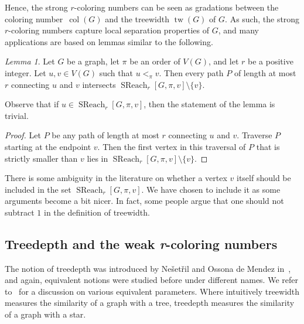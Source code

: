 \documentclass[1p,number,a4paper]{elsarticle}
\theoremstyle{remark}
\DeclareMathOperator{\col}{col}
\DeclareMathOperator{\tw}{tw}
\DeclareMathOperator{\SReach}{SReach}
\newtheorem{lemma}[theorem]{Lemma}
\begin{document}
Hence, the strong $r$-coloring numbers can be seen as gradations 
between the coloring number~$\col(G)$ and the treewidth $\tw(G)$ of
$G$. As such, the strong $r$-coloring numbers 
capture local separation properties of $G$, and many applications are based
on lemmas similar to the following. 

\pagebreak

\begin{lemma}\label{lem:sep-col}
Let $G$ be a graph, let $\pi$ be an order of $V(G)$, and let 
$r$ be a positive integer. Let $u,v\in 
V(G)$ such that $u<_\pi v$. Then every path $P$ of length at most 
$r$ connecting $u$ and $v$ intersects $\SReach_r[G,\pi,v]\setminus\{v\}$. 
\end{lemma}

Observe that if $u\in \SReach_r[G,\pi,v]$, then the statement of the
lemma is trivial. 

 \begin{proof}
 Let $P$ be any path of length
 at most $r$ connecting $u$ and $v$. Traverse $P$ starting 
 at the endpoint $v$. Then the first vertex in this 
 traversal of $P$ that is strictly smaller than $v$ lies in 
 $\SReach_r[G,\pi,v]\setminus\{v\}$. 
 \end{proof}



There is some ambiguity in the literature on whether a vertex
$v$ itself should be included in the set $\SReach_r[G,\pi,v]$. 
We have chosen to include it as some arguments become
a bit nicer. In fact, some people argue that one should not subtract $1$ in the definition of treewidth.

\subsection{Treedepth and the weak \textit{r}-coloring numbers}


The notion of treedepth was introduced by Ne\v{s}et\v{r}il and
Ossona de Mendez 
in~\cite{nevsetvril2006tree}, and
again, equivalent notions were studied before under different 
names. We refer to~\cite{nevsetril2012sparsity} for a discussion 
on various equivalent parameters. 
Where intuitively treewidth measures the similarity
of a graph with a tree, treedepth measures the similarity 
of a graph with a star. 

\end{document}
